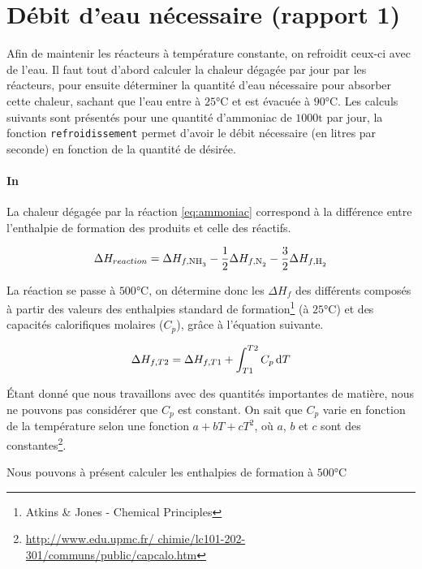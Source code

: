 \section{Débit d'eau nécessaire (rapport 1)}

Afin de maintenir les réacteurs à température constante, 
on refroidit ceux-ci avec de l'eau.
Il faut tout d'abord calculer la chaleur dégagée par jour par les réacteurs,
pour ensuite déterminer la quantité d'eau nécessaire pour absorber cette chaleur,
sachant que l'eau entre à $25 \si{\degreeCelsius}$ et 
est évacuée à $90 \si{\degreeCelsius}$.
Les calculs suivants sont présentés pour une quantité d'ammoniac de $1000\si{\tonne}$ par jour, 
la fonction \texttt{refroidissement} permet d'avoir le débit nécessaire (en litres par seconde) 
en fonction de la quantité de  désirée.

\paragraph{In}

La chaleur dégagée par la réaction \ref{eq:ammoniac} correspond à la 
différence entre l'enthalpie de formation des produits et celle des réactifs. 

\begin{equation}
	\Delta H_{reaction} = \Delta H_{f, \ce{NH3}} 
	- \frac{1}{2} \Delta H_{f, \ce{N2}}
	- \frac{3}{2} \Delta H_{f, \ce{H2}}
	\label{eq:enthalpie_reaction}
\end{equation}

La réaction se passe à $500 \si{\degreeCelsius}$, 
on détermine donc les $\Delta H_{f}$ des différents 
composés à partir des valeurs des enthalpies standard
de formation\footnote{Atkins \& Jones - Chemical Principles}
(à $25 \si{\degreeCelsius}$)
et des capacités calorifiques molaires ($C_p$), gr\^ace 
à l'équation suivante.

\begin{equation*}
	\Delta H_{f, T2} = \Delta H_{f, T1} 
	+ \int_{T1}^{T2} C_p \, \mathrm{d}T
\end{equation*}

Étant donné que nous travaillons avec des quantités importantes de matière,
nous ne pouvons pas considérer que $C_p$ est constant.
On sait que $C_p$ varie en fonction de la température 
selon une fonction $a + b T + c T^2$, 
où $a$, $b$ et $c$ sont des constantes\footnote{\url{http://www.edu.upmc.fr/
chimie/lc101-202-301/communs/public/capcalo.htm}}. 

Nous pouvons à présent calculer les enthalpies 
de formation à $500 \si{\degreeCelsius}$

